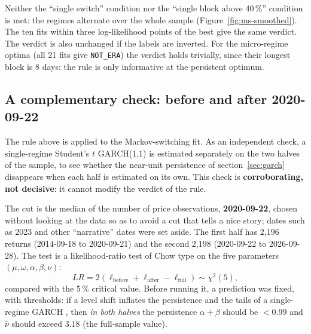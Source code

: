 \documentclass[12pt,a4paper]{article}
\begin{document}
Neither the ``single switch'' condition nor the ``single block above 40\,\%'' condition is met: the regimes alternate over the whole sample (Figure~\ref{fig:ms-smoothed}). The ten fits within three log-likelihood points of the best give the same verdict. The verdict is also unchanged if the labels are inverted. For the micro-regime optima (all 21 fits give \texttt{NOT\_\allowbreak{}ERA}) the verdict holds trivially, since their longest block is 8 days: the rule is only informative at the persistent optimum.

\subsection{A complementary check: before and after 2020-09-22}

The rule above is applied to the Markov-switching fit. As an independent check, a single-regime Student's $t$ GARCH(1,1) is estimated separately on the two halves of the sample, to see whether the near-unit persistence of section~\ref{sec:garch} disappears when each half is estimated on its own. This check is \textbf{corroborating, not decisive}: it cannot modify the verdict of the rule.

The cut is the median of the number of price observations, \textbf{2020-09-22}, chosen without looking at the data so as to avoid a cut that tells a nice story; dates such as 2023 and other ``narrative'' dates were set aside. The first half has 2,196 returns (2014-09-18 to 2020-09-21) and the second 2,198 (2020-09-22 to 2026-09-28). The test is a likelihood-ratio test of Chow type \citep{chow1960} on the five parameters $(\mu,\omega,\alpha,\beta,\nu)$:
\begin{equation}
	LR = 2\left(\ell_{\text{before}} + \ell_{\text{after}} - \ell_{\text{full}}\right) \sim \chi^2(5),
\end{equation}
compared with the 5\,\% critical value. Before running it, a prediction was fixed, with thresholds: if a level shift inflates the persistence and the tails of a single-regime GARCH \citep{lamoureuxlastrapes1990}, then \emph{in both halves} the persistence $\alpha+\beta$ should be $<0.99$ and $\hat\nu$ should exceed $3.18$ (the full-sample value).
\end{document}
